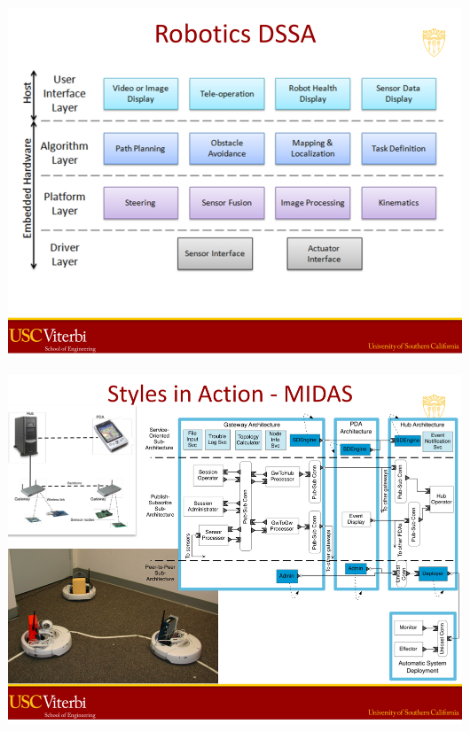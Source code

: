 \documentclass[xetex,mathserif,serif]{beamer}
\begin{document}
	\begin{frame}
		\begin{center}
			\includegraphics[width=0.9\textwidth]{medvidovic7.png}
		\end{center}
	\end{frame}

	\begin{frame}
		\begin{center}
			\includegraphics[width=0.9\textwidth]{medvidovic8.png}
		\end{center}
	\end{frame}
\end{document}
